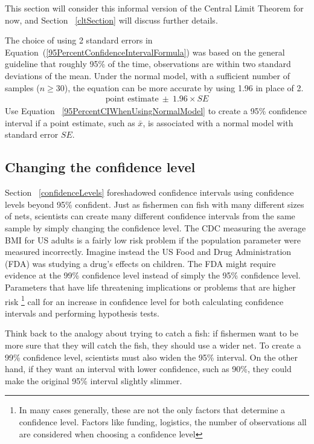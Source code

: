 This section will consider this informal version of the Central Limit Theorem for now, and Section ~\ref{cltSection} will discuss further details. 

The choice of using 2 standard errors in Equation~(\ref{95PercentConfidenceIntervalFormula}) was based on the general guideline that roughly 95\% of the time, observations are within two standard deviations of the mean. Under the normal model, with a sufficient number of samples ($n\geq 30$), the equation can be more accurate by using 1.96 in place of 2.
\begin{eqnarray}
\text{point estimate}\ \pm\ 1.96\times SE
\label{95PercentCIWhenUsingNormalModel}
\end{eqnarray}
Use Equation ~\ref{95PercentCIWhenUsingNormalModel} to create a 95\% confidence interval if a point estimate, such as $\bar{x}$, is associated with a normal model with standard error $SE$.

\subsection{Changing the confidence level}
\label{changingTheConfidenceLevelSection}

Section ~\ref{confidenceLevels} foreshadowed confidence intervals using confidence levels beyond 95\% confident. Just as fishermen can fish with many different sizes of nets, scientists can create many different confidence intervals from the same sample by simply changing the confidence level. The CDC measuring the average BMI for US adults is a fairly low risk problem if the population parameter were measured incorrectly. Imagine instead the US Food and Drug Administration (FDA) was studying a drug's effects on children. The FDA might require evidence at the 99\% confidence level instead of simply the 95\% confidence level. Parameters that have life threatening implications or problems that are higher risk \footnote{In many cases generally, these are not the only factors that determine a confidence level. Factors like funding, logistics, the number of observations all are considered when choosing a confidence level} call for an increase in confidence level for both calculating confidence intervals and performing hypothesis tests. 

Think back to the analogy about trying to catch a fish: if fishermen want to be more sure that they will catch the fish, they should use a wider net. To create a 99\% confidence level, scientists must also widen the 95\% interval. On the other hand, if they want an interval with lower confidence, such as 90\%, they could make the original 95\% interval slightly slimmer.

